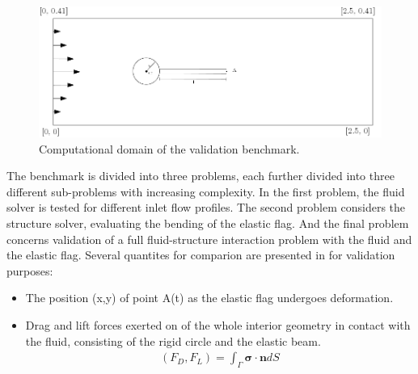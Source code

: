 \begin{figure}[h!]
  \centering
    \includegraphics[scale=0.2]{./Fig/turekflag.png}
      \caption{Computational domain of the validation benchmark.}
      \label{fig:tflag}
\end{figure}

The benchmark is divided into three problems, each further divided into three different sub-problems with increasing complexity. In the first problem, the fluid solver is tested for different inlet flow profiles. The second problem considers the structure solver, evaluating the bending of the elastic flag. And the final problem concerns validation of a full fluid-structure interaction problem with the fluid and the elastic flag.  Several quantites for comparion are presented in \cite{Hron2006} for validation purposes:

\begin{itemize}
\item The position (x,y) of point A(t) as the elastic flag undergoes deformation.
\item Drag and lift forces exerted on of the whole interior geometry in contact with the fluid, consisting of the rigid circle and the elastic beam.
\begin{align*}
(F_D, F_L) = \int_{\Gamma} \mathbf{\sigma} \cdot \mathbf{n} dS
\end{align*}
\end{itemize}

